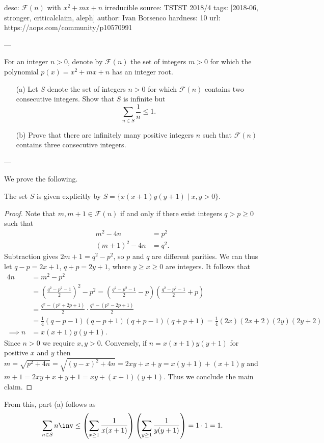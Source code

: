 desc: $\mathcal F(n)$ with $x^2+mx+n$ irreducible
source: TSTST 2018/4
tags: [2018-06, stronger, criticalclaim, aleph]
author: Ivan Borsenco
hardness: 10
url: https://aops.com/community/p10570991

---

For an integer $n > 0$,
denote by $\mathcal F(n)$ the set of integers $m > 0$ for which
the polynomial $p(x) = x^2 + mx + n$ has an integer root.
\begin{enumerate}
\item [(a)] Let $S$ denote the set of integers $n > 0$
  for which $\mathcal F(n)$ contains two consecutive integers.
  Show that $S$ is infinite but
  \[ \sum_{n \in S} \frac 1n \le 1. \]
\item [(b)] Prove that there are infinitely many positive integers $n$
  such that $\mathcal F(n)$ contains three consecutive integers.
\end{enumerate}

---

We prove the following.
\begin{claim*}
  The set $S$ is given explicitly by
  $S = \{ x(x+1)y(y+1) \mid x,y > 0 \}$.
\end{claim*}
\begin{proof}
  Note that $m, m+1 \in \mathcal F(n)$ if and only if
  there exist integers $q > p \ge 0$ such that
  \begin{align*}
    m^2 - 4n &= p^2 \\
    (m+1)^2 - 4n &= q^2.
  \end{align*}
  Subtraction gives $2m+1 = q^2-p^2$, so $p$ and $q$ are different parities.
  We can thus let $q-p = 2x+1$, $q+p = 2y+1$, where $y \ge x \ge 0$ are integers.
  It follows that
  \begin{align*}
    4n &= m^2 - p^2 \\
    &= \left( \frac{q^2-p^2-1}{2} \right)^2 - p^2
    = \left( \frac{q^2-p^2-1}{2} - p \right) \left( \frac{q^2-p^2-1}{2} + p \right) \\
    &= \frac{q^2-(p^2+2p+1)}{2} \cdot \frac{q^2-(p^2-2p+1)}{2} \\
    &= \frac14 (q-p-1)(q-p+1)(q+p-1)(q+p+1)
    = \frac14 (2x)(2x+2)(2y)(2y+2) \\
    \implies n &= x(x+1)y(y+1).
  \end{align*}
  Since $n > 0$ we require $x,y > 0$.
  Conversely, if $n = x(x+1)y(y+1)$ for positive $x$ and $y$ then
  $m = \sqrt{p^2+4n} = \sqrt{(y-x)^2+4n} = 2xy+x+y = x(y+1) + (x+1)y$
  and $m+1 = 2xy+x+y+1 = xy + (x+1)(y+1)$.
  Thus we conclude the main claim.
\end{proof}
From this, part (a) follows as
\[ \sum_{n \in S} n\inv
  \le
  \left( \sum_{x \ge 1} \frac{1}{x(x+1)} \right)
  \left( \sum_{y \ge 1} \frac{1}{y(y+1)} \right)
  = 1 \cdot 1 = 1.
\]

